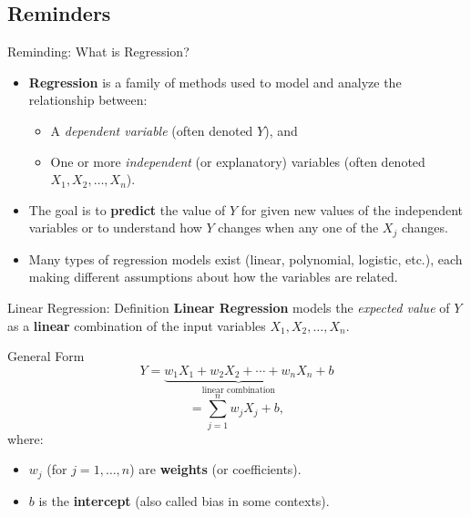 \subsection{Reminders}
\begin{frame}{Reminding: What is Regression?}
\begin{itemize}
    \item \textbf{Regression} is a family of methods used to model and analyze the relationship between:
    \begin{itemize}
        \item A \textit{dependent variable} (often denoted \(Y\)), and
        \item One or more \textit{independent} (or explanatory) variables (often denoted \(X_1, X_2, \ldots, X_n\)).
    \end{itemize}
    \item The goal is to \textbf{predict} the value of \(Y\) for given new values of the independent variables or to understand how \(Y\) changes when any one of the \(X_j\) changes.
    \item Many types of regression models exist (linear, polynomial, logistic, etc.), each making different assumptions about how the variables are related.
\end{itemize}
\end{frame}


\begin{frame}{Linear Regression: Definition}
\textbf{Linear Regression} models the \textit{expected value} of \(Y\) as a \textbf{linear} combination of the input variables \(X_1, X_2, \dots, X_n\).

\begin{block}{General Form}
\[
Y = \underbrace{w_1 X_1 + w_2 X_2 + \cdots + w_n X_n}_{\text{linear combination}} + b
\]
\[
= \sum_{j=1}^{n} w_j X_j + b,
\]
where:
\begin{itemize}
    \item \(w_j\) (for \(j = 1, \dots, n\)) are \textbf{weights} (or coefficients).
    \item \(b\) is the \textbf{intercept} (also called bias in some contexts).
\end{itemize}
\end{block}
\end{frame}

